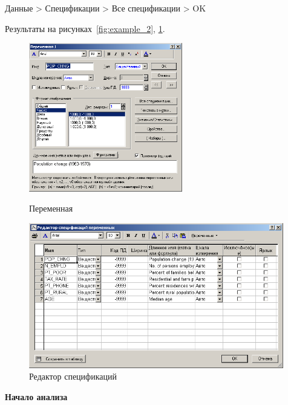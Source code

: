\newpage

Данные > Спецификации > Все спецификации > OK 

Результаты на рисунках~\ref{fig:example_2}, \ref{fig:example_3}.

\begin{figure}[!h]
  \centering
  \begin{minipage}{0.49\textwidth}
    \centering

    \includegraphics[height=6.5cm]
    {inc/example_2.PNG}

    \caption{Переменная}
    \label{fig:example_2}
  \end{minipage}
  \begin{minipage}{0.49\textwidth}
    \centering

    \includegraphics[width=0.99\textwidth]
    {inc/example_3.PNG}

    \caption{Редактор спецификаций}
    \label{fig:example_3}
  \end{minipage}
\end{figure}

\begin{center}
  \textbf{Начало анализа}
\end{center}

